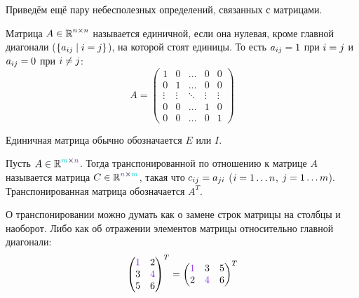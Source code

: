 \documentclass[a4paper,12pt]{article}
\theoremstyle{remark}
\begin{document}
  Приведём ещё пару небесполезных определений, связанных с матрицами.
  
  \begin{definition}
    Матрица $A \in \operatorname{\mathbb R}^{n \times n}$ называется единичной, если она нулевая, кроме главной диагонали ($\{a_{ij} \hm\mid i \hm= j\}$), на которой стоят единицы.
    То есть $a_{ij} \hm= 1$ при $i \hm= j$ и $a_{ij} \hm= 0$ при $i \hm{\not=} j$:
    \[
      A = \begin{pmatrix}
        1      & 0      & \ldots & 0       & 0\\
        0      & 1      & \ldots & 0       & 0\\
        \vdots & \vdots & \ddots & \vdots & \vdots\\
        0      & 0      & \ldots & 1      & 0\\
        0      & 0      & \ldots & 0      & 1
      \end{pmatrix}
    \]
    
    Единичная матрица обычно обозначается $E$ или $I$.
  \end{definition}
  
  \begin{definition}
    Пусть $A \hm\in \RR^{\textcolor{light-cyan}{m} \times \textcolor{light-purple}{n}}$.
    Тогда транспонированной по отношению к матрице $A$ называется матрица $C \hm\in \RR^{\textcolor{light-purple}{n} \times \textcolor{light-cyan}{m}}$, такая что $c_{ij} \hm= a_{ji}$ ($i \hm= 1 \ldots n$, $j \hm= 1 \ldots m$).
    Транспонированная матрица обозначается $A^T$.
  \end{definition}
  
  \begin{example}
    О транспонировании можно думать как о замене строк матрицы на столбцы и наоборот.
    Либо как об отражении элементов матрицы относительно главной диагонали:
    \[
      \begin{pmatrix}
        \textcolor{light-purple}{1} & 2\\
        3                           & \textcolor{light-purple}{4}\\
        5                           & 6
      \end{pmatrix}^T
      = \begin{pmatrix}
        \textcolor{light-purple}{1} & 3                           & 5\\
        2                           & \textcolor{light-purple}{4} & 6
      \end{pmatrix}^T
    \]
  \end{example}
  
\end{document}
